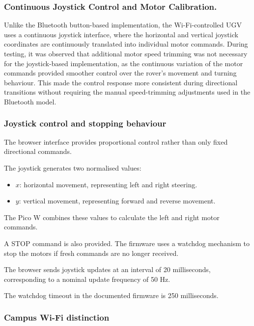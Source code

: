 \documentclass[11pt,a4paper]{article}
\begin{document}
\subsubsection{Continuous Joystick Control and Motor Calibration.}
Unlike the Bluetooth button-based implementation, the Wi-Fi-controlled UGV uses a 
continuous joystick interface, where the horizontal and vertical joystick coordinates 
are continuously translated into individual motor commands. During testing, it was observed 
that additional motor speed trimming was not necessary for the joystick-based implementation,
as the continuous variation of the motor commands provided smoother control over the rover's 
movement and turning behaviour. This made the control response more consistent during 
directional transitions without requiring the manual speed-trimming adjustments used in the 
Bluetooth model.

\subsubsection{Joystick control and stopping behaviour}

The browser interface provides proportional control
rather than only fixed directional commands.

The joystick generates two normalised values:

\begin{itemize}
    \item \(x\): horizontal movement, representing
    left and right steering.
    \item \(y\): vertical movement, representing
    forward and reverse movement.
\end{itemize}

The Pico W combines these values to calculate the
left and right motor commands.

A STOP command is also provided. The firmware uses
a watchdog mechanism to stop the motors if fresh
commands are no longer received.

The browser sends joystick updates at an interval
of 20 milliseconds, corresponding to a nominal
update frequency of 50 Hz.

The watchdog timeout in the documented firmware is
250 milliseconds.


\subsubsection{Campus Wi-Fi distinction}
\end{document}
